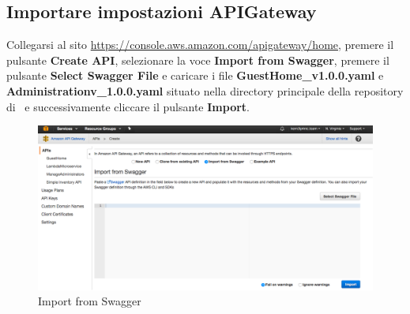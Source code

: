 \documentclass[../ManualeSviluppatore_v1.0.0.tex]{subfiles}
\begin{document}
	\subsection{Importare impostazioni APIGateway}
		Collegarsi al sito \url{https://console.aws.amazon.com/apigateway/home}, premere il pulsante \textbf{Create API}, selezionare la voce \textbf{Import from Swagger}, premere il pulsante \textbf{Select Swagger File} e caricare i file \textbf{GuestHome\_v1.0.0.yaml} e \textbf{Administrationv\_1.0.0.yaml} situato nella directory principale della repository di \atavi\ e successivamente cliccare il pulsante \textbf{Import}.
		\begin{figure}[!h]
			\centering
			\includegraphics[width=\textwidth]{Screenshot/ImportSwagger.png}
			\caption{Import from Swagger}
		\end{figure}
\end{document}
